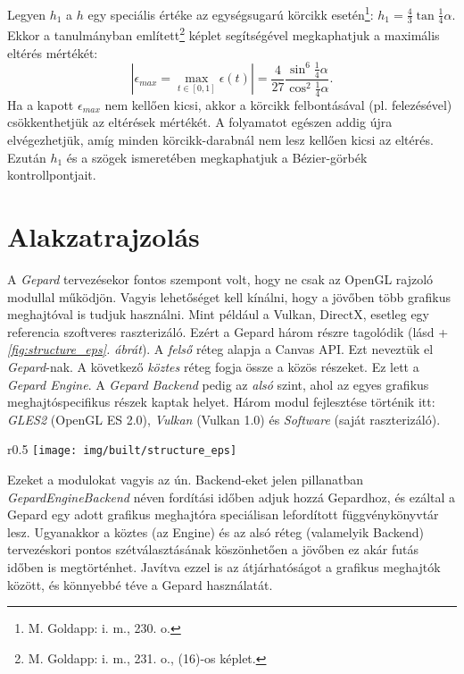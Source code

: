 \documentclass[12pt]{report}
\theoremstyle{definition}
\newcommand{\func}[1]{{\textsl{#1}}}
\newcommand{\melyikoldalra}{r}
\begin{document}
Legyen $h_1$ a $h$ egy speciális értéke az egységsugarú körcikk
esetén\footnote{M. Goldapp: i. m., 230. o.}: $h_1 = \frac{4}{3} \tan{\frac{1}{4}
\alpha}$. Ekkor a \cite[Goldapp]{Goldapp:1991:approximation} tanulmányban
említett\footnote{M.  Goldapp: i. m., 231. o., (16)-os képlet.} képlet
segítségével megkaphatjuk a maximális eltérés mértékét: \begin{equation}
\label{eq:2} |\epsilon_{max} = \max_{{t\in[0, 1]}} \epsilon(t)| = \frac{4}{27}
\frac{\sin^6{\frac{1}{4} \alpha}}{\cos^2{\frac{1}{4} \alpha}}. \end{equation} Ha
a kapott $\epsilon_{max}$ nem kellően kicsi, akkor a körcikk felbontásával (pl.
felezésével) csökkenthetjük az eltérések mértékét. A folyamatot egészen addig
újra elvégezhetjük, amíg minden körcikk-darabnál nem lesz kellően kicsi az
eltérés. Ezután $h_1$ és a szögek ismeretében megkaphatjuk a Bézier-görbék
kontrollpontjait.



    \chapter{Alakzatrajzolás}

A \emph{Gepard} tervezésekor fontos szempont volt, hogy ne csak az OpenGL
rajzoló modullal működjön. Vagyis lehetőséget kell kínálni, hogy a jövőben több
grafikus meghajtóval is tudjuk használni. Mint például a Vulkan, DirectX,
esetleg egy referencia szoftveres raszterizáló. Ezért a Gepard három részre
tagolódik (lásd \az+\emph{\ref{fig:structure_eps}. ábrát}). A \emph{felső} réteg
alapja a Canvas API. Ezt neveztük el \emph{Gepard}-nak. A következő
\emph{köztes} réteg fogja össze a közös részeket. Ez lett a \emph{Gepard
Engine}. A \emph{Gepard Backend} pedig az \emph{alsó} szint, ahol az egyes
grafikus meghajtóspecifikus részek kaptak helyet. Három modul fejlesztése
történik itt: \emph{GLES2} (OpenGL ES 2.0), \emph{Vulkan} (Vulkan 1.0) és
\emph{Software} (saját raszterizáló).
  \begin{wrapfigure}{\melyikoldalra}{0.5\textwidth}
    \texttt{[image: img/built/structure\_eps]}
    \caption{\label{fig:structure_eps} A három fő réteg}
  \end{wrapfigure}
Ezeket a modulokat vagyis az ún. Backend-eket jelen pillanatban
\func{GepardEngineBackend} néven fordítási időben adjuk hozzá Gepardhoz, és
ezáltal a Gepard egy adott grafikus meghajtóra speciálisan lefordított
függvénykönyvtár lesz. Ugyanakkor a köztes (az Engine) és az alsó réteg
(valamelyik Backend) tervezéskori pontos szétválasztásának köszönhetően a
jövőben ez akár futás időben is megtörténhet. Javítva ezzel is az átjárhatóságot
a grafikus meghajtók között, és könnyebbé téve a Gepard használatát.
\end{document}
